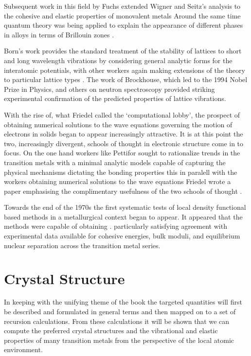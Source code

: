 Subsequent work in this field by Fuchs extended Wigner and Seitz's analysis
to the cohesive and elastic properties of monovalent metals \cite{fuchs35, fuchs36} 
Around the same time quantum theory was being
applied to explain the appearance of different phases in alloys in terms 
of Brillouin zones \cite{bethe29, bouckhaert36, owen33, jones34}. 

Born's work provides the standard treatment of 
the stability of lattices to short and long wavelength
vibrations by considering general analytic forms for the interatomic potentials\cite{born40,born42},
with other workers again making extensions of the theory to particular
lattice types \cite{power41, nabarro52}. The work of Brockhouse, which led to the 1994
Nobel Prize in Physics, and others on neutron spectroscopy provided striking 
experimental confirmation of the predicted properties of lattice vibrations\cite{brockhouse62}.

With the rise of, what Friedel called the `computational lobby', the prospect 
of obtaining numerical solutions to the wave equations governing the motion of 
electrons in solids began to appear increasingly attractive. It is at this
point the two, increasingly divergent, schools of thought in electronic structure
come in to focus. On the one hand workers like Pettifor \cite{pettifor69} sought
to rationalize trends in the transition metals with a minimal analytic models capable of 
capturing the physical mechanisms dictating the bonding properties this in paralell
with the workers obtaining numerical solutions to the wave equations \cite{andersen75, jepsen75}
Friedel wrote a paper emphasising the complimentary usefulness of the two schools of thought
\cite{friedel73}.

Towards the end of the 1970s the first systematic tests of local density 
functional based methods in a metallurgical context began to appear.
It appeared that the methods were capable of obtaining \cite{moruzzi77, gelatt77}. 
particularly satisfying agreement with experimental data available for 
cohesive energies, bulk moduli, and equilibrium nuclear separation across 
the transition metal series.

\section{Crystal Structure}
In keeping with the unifying theme of the book the targeted quantities
will first be described and formulated in general terms and then mapped
on to a set of recursion calculations. From these calculations it will be
shown that we can compute the preferred crystal structures and the vibrational and 
elastic properties of many transition metals from the perspective of the 
local atomic environment.

